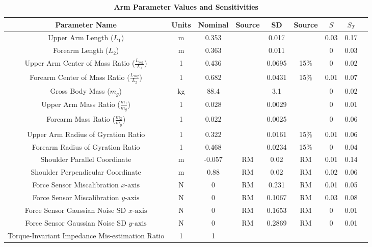 \begin{table}[!ht]
\caption{
\bf{Arm Parameter Values and Sensitivities}}
\begin{tabular}{|c|c|c c|c c|c c|c|}
\hline
Parameter Name &
Units &
Nominal &
Source &
SD &
Source &
$S$ &
$S_T$ \\ \hline
Upper Arm Length ($L_1$) &
m &
0.353 &
\cite{dempster1955space} &
0.017 &
\cite{dempster1955space} &
0.03 &
0.17 \\
Forearm Length ($L_2$) &
m &
0.363 &
\cite{dempster1955space} &
0.011 &
\cite{dempster1955space} &
0 &
0.03 \\
Upper Arm Center of Mass Ratio ($\frac{L_{m1}}{L_1}$) &
1 &
0.436 &
\cite{winter2009biomechanics} &
0.0695 &
15\% &
0 &
0.02 \\
Forearm Center of Mass Ratio ($\frac{L_{m2}}{L_2}$) &
1 &
0.682 &
\cite{winter2009biomechanics} &
0.0431 &
15\% &
0.01 &
0.07 \\
Gross Body Mass ($m_g$) &
kg &
88.4 &
\cite{fryar2012anthropometric} &
3.1 &
\cite{stunkard1981accuracy} &
0 &
0.02 \\
Upper Arm Mass Ratio ($\frac{m_1}{m_g}$) &
1 &
0.028 &
\cite{winter2009biomechanics} &
0.0029 &
\cite{dempster1955space} &
0 &
0.01 \\
Forearm Mass Ratio ($\frac{m_2}{m_g}$) &
1 &
0.022 &
\cite{winter2009biomechanics} &
0.0025 &
\cite{dempster1955space} &
0 &
0.06 \\
Upper Arm Radius of Gyration Ratio &
1 &
0.322 &
\cite{winter2009biomechanics} &
0.0161 &
15\% &
0.01 &
0.06 \\
Forearm Radius of Gyration Ratio &
1 &
0.468 &
\cite{winter2009biomechanics} &
0.0234 &
15\% &
0 &
0.04 \\
Shoulder Parallel Coordinate &
m &
-0.057 &
RM &
0.02 &
RM &
0.01 &
0.14 \\
Shoulder Perpendicular Coordinate &
m &
0.88 &
RM &
0.02 &
RM &
0.02 &
0.06 \\
Force Sensor Miscalibration $x\text{-axis}$ &
N &
0 &
RM &
0.231 &
RM &
0.01 &
0.05 \\
Force Sensor Miscalibration $y\text{-axis}$ &
N &
0 &
RM &
0.1067 &
RM &
0.03 &
0.08 \\
Force Sensor Gaussian Noise SD $x\text{-axis}$ &
N &
0 &
RM &
0.1653 &
RM &
0 &
0.01 \\
Force Sensor Gaussian Noise SD $y\text{-axis}$ &
N &
0 &
RM &
0.2869 &
RM &
0 &
0.01 \\
Torque-Invariant Impedance Mis-estimation Ratio &
1 &
1 &
\cite{burdet2006stability} &

\end{tabular}
\end{table}
